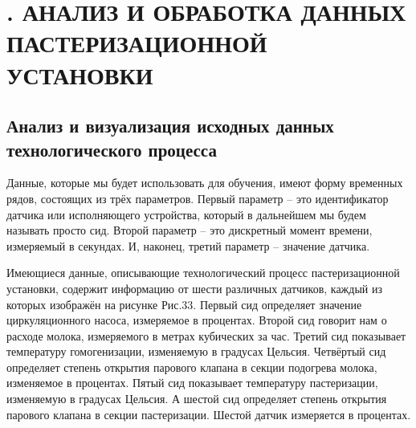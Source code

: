 \sectionbreak \section*{
  \cyrillicfont 
  \fontsize{14pt}{0pt}\selectfont
  \englishfont 
  . АНАЛИЗ И ОБРАБОТКА ДАННЫХ ПАСТЕРИЗАЦИОННОЙ УСТАНОВКИ
}

\titlespace
\subsection*{ 
  \cyrillicfont 
  \fontsize{14pt}{0pt}\selectfont
  \englishfont
   Анализ и визуализация исходных данных технологического процесса
} 
\titlespace

{\cyrillicfont 
\fontsize{13pt}{16.25pt}\selectfont 
\englishfont 

  \par \redline Данные, которые мы будет использовать для обучения, имеют форму временных рядов, состоящих из трёх параметров. Первый параметр – это идентификатор датчика или исполняющего устройства, который в дальнейшем мы будем называть просто сид. Второй параметр – это дискретный момент времени, измеряемый в секундах. И, наконец, третий параметр – значение датчика. 

  \par \redline Имеющиеся данные, описывающие технологический процесс пастеризационной установки, содержит информацию от шести различных датчиков, каждый из которых изображён на рисунке Рис.33. Первый сид определяет значение циркуляционного насоса, измеряемое в процентах. Второй сид говорит нам о расходе молока, измеряемого в метрах кубических за час. Третий сид показывает температуру гомогенизации, изменяемую в градусах Цельсия. Четвёртый сид определяет степень открытия парового клапана в секции подогрева молока, изменяемое в процентах. Пятый сид показывает температуру пастеризации, изменяемую в градусах Цельсия. А шестой сид определяет степень открытия парового клапана в секции пастеризации. Шестой датчик измеряется в процентах.

}
